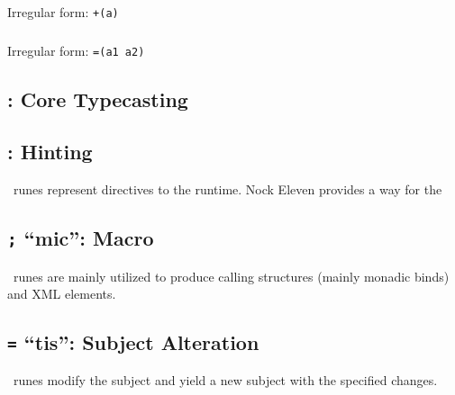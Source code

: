 \subsubsection{\pdotlus}

Irregular form:  \texttt{+(a)}

\subsubsection{\pdottar}

\subsubsection{\pdottis}

Irregular form:  \texttt{=(a1 a2)}

\subsubsection{\pdotwut}

\subsection{\ket:  Core Typecasting}

\subsection{\psig:  Hinting}


\psig~runes represent directives to the runtime.  Nock Eleven provides a way for the


\subsection{\texttt{;} “mic”:  Macro}

\mic~runes are mainly utilized to produce calling structures (mainly monadic binds) and XML elements.


\subsection{\texttt{=} “tis”:  Subject Alteration}

\tis~runes modify the subject and yield a new subject with the specified changes.

